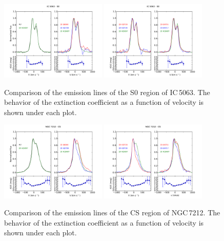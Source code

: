 \documentclass[../main.tex]{subfiles}
\begin{document}
\begin{figure}
\centering
\includegraphics[width=0.45\textwidth]{images/paper1/IC5063_s0_l1.pdf} \quad
\includegraphics[width=0.45\textwidth]{images/paper1/IC5063_s0_l2.pdf}\\
\caption[]{Comparison of the emission lines of the S0 region of IC\,5063. The behavior of the extinction coefficient as a function of velocity is shown under each plot.}
\label{fig:profile_ex_IC}
\end{figure}

\begin{figure}
\centering
\includegraphics[width=0.45\textwidth]{images/paper1/NGC7212_cs_l1.pdf} \quad
\includegraphics[width=0.45\textwidth]{images/paper1/NGC7212_cs_l2.pdf}\\
\caption[]{Comparison of the emission lines of the CS region of NGC\,7212. The behavior of the extinction coefficient as a function of velocity is shown under each plot.}
\label{fig:profile_ex_NGC}
\end{figure}
\end{document}

